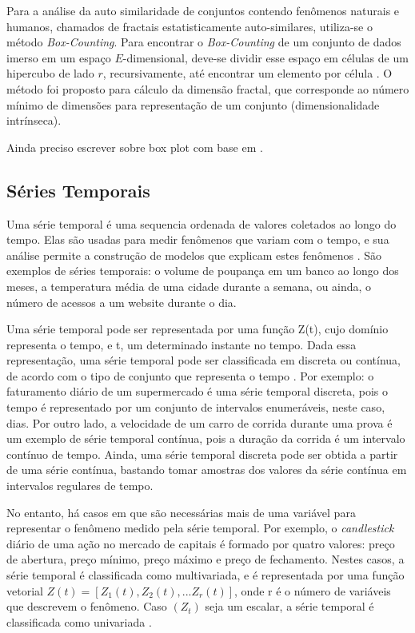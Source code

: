 Para a análise da auto similaridade de conjuntos contendo fenômenos naturais e
humanos, chamados de fractais estatisticamente auto-similares, utiliza-se o
método \textit{Box-Counting}. Para encontrar o \textit{Box-Counting} de um
conjunto de dados imerso em um espaço $E$-dimensional, deve-se dividir esse
espaço em células de um hipercubo de lado $r$, recursivamente, até encontrar um
elemento por célula \cite{Traina2010}. O método foi proposto para cálculo da
dimensão fractal, que corresponde ao número mínimo de dimensões para
representação de um conjunto (dimensionalidade intrínseca). 

Ainda preciso escrever sobre box plot com base em \cite{Traina2010}.

\subsection{Séries Temporais}
	\label{subsec:series_temporais}

Uma série temporal é uma sequencia ordenada de valores coletados ao longo do
tempo. Elas são usadas para medir fenômenos que variam com o tempo, e sua
análise permite a construção de modelos que explicam estes fenômenos
\cite{morettin2006analise}. São exemplos de séries temporais: o volume de
poupança em um banco ao longo dos meses, a temperatura média de uma cidade
durante a semana, ou ainda, o número de acessos a um website durante o dia.

Uma série temporal pode ser representada por uma função Z(t), cujo domínio
representa o tempo, e t, um determinado instante no tempo. Dada essa
representação, uma série temporal pode ser classificada em discreta ou contínua,
de acordo com o tipo de conjunto que representa o tempo
\cite{morettin2006analise}. Por exemplo: o faturamento diário de um supermercado
é uma série temporal discreta, pois o tempo é representado por um conjunto de
intervalos enumeráveis, neste caso, dias. Por outro lado, a velocidade de um
carro de corrida durante uma prova é um exemplo de série temporal contínua, pois
a duração da corrida é um intervalo contínuo de tempo. Ainda, uma série temporal
discreta pode ser obtida a partir de uma série contínua, bastando tomar amostras
dos valores da série contínua em intervalos regulares de tempo.

No entanto, há casos em que são necessárias mais de uma variável para
representar o fenômeno medido pela série temporal. Por exemplo, o
\emph{candlestick} diário de uma ação no mercado de capitais é formado por
quatro valores: preço de abertura, preço mínimo, preço máximo e preço de
fechamento. Nestes casos, a série temporal é classificada como multivariada, e é
representada por uma função vetorial
$Z\left(t\right) =
	\left[
		Z_1\left(t\right),
		Z_2\left(t\right),
		...
		Z_r\left(t\right)
	\right]$,
onde r é o número de variáveis que descrevem o fenômeno. Caso $\left(Z_t\right)$
seja um escalar, a série temporal é classificada como univariada
\cite{morettin2006analise}.

